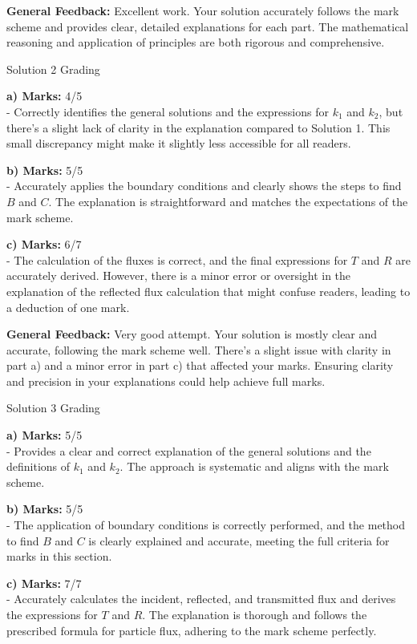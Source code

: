 \documentclass[a4paper,11pt]{article}
\begin{document}
\textbf{General Feedback:} Excellent work. Your solution accurately follows the mark scheme and provides clear, detailed explanations for each part. The mathematical reasoning and application of principles are both rigorous and comprehensive.

Solution 2 Grading

\textbf{a) Marks:} 4/5 \\
- Correctly identifies the general solutions and the expressions for \(k_1\) and \(k_2\), but there's a slight lack of clarity in the explanation compared to Solution 1. This small discrepancy might make it slightly less accessible for all readers.

\textbf{b) Marks:} 5/5 \\
- Accurately applies the boundary conditions and clearly shows the steps to find \(B\) and \(C\). The explanation is straightforward and matches the expectations of the mark scheme.

\textbf{c) Marks:} 6/7 \\
- The calculation of the fluxes is correct, and the final expressions for \(T\) and \(R\) are accurately derived. However, there is a minor error or oversight in the explanation of the reflected flux calculation that might confuse readers, leading to a deduction of one mark.

\textbf{General Feedback:} Very good attempt. Your solution is mostly clear and accurate, following the mark scheme well. There's a slight issue with clarity in part a) and a minor error in part c) that affected your marks. Ensuring clarity and precision in your explanations could help achieve full marks.

Solution 3 Grading

\textbf{a) Marks:} 5/5 \\
- Provides a clear and correct explanation of the general solutions and the definitions of \(k_1\) and \(k_2\). The approach is systematic and aligns with the mark scheme.

\textbf{b) Marks:} 5/5 \\
- The application of boundary conditions is correctly performed, and the method to find \(B\) and \(C\) is clearly explained and accurate, meeting the full criteria for marks in this section.

\textbf{c) Marks:} 7/7 \\
- Accurately calculates the incident, reflected, and transmitted flux and derives the expressions for \(T\) and \(R\). The explanation is thorough and follows the prescribed formula for particle flux, adhering to the mark scheme perfectly.
\end{document}
